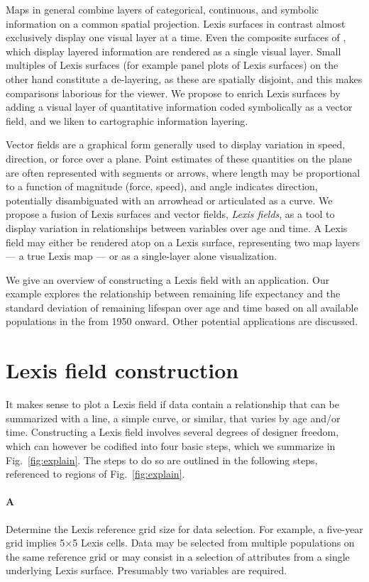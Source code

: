 \documentclass{article}
\begin{document}
Maps in general combine layers of categorical, continuous, and
symbolic information on a common spatial projection. Lexis surfaces in contrast almost exclusively display one visual layer at a time. Even the composite surfaces of \citet{scholey2017visualizing}, which display layered information are rendered as a single visual layer. Small multiples of Lexis surfaces (for example panel plots of Lexis surfaces) on the other hand constitute a de-layering, as these are spatially disjoint, and this makes comparisons laborious for the viewer. We propose to enrich Lexis surfaces by adding a visual layer of quantitative information coded symbolically as a vector field, and we liken to cartographic information layering.

Vector fields are a graphical form generally used to display variation in speed,
direction, or force over a plane. Point estimates of these quantities on the plane are
often represented with segments or arrows, where length may be proportional to a function of
magnitude (force, speed), and angle indicates direction, potentially disambiguated with an arrowhead or articulated as a curve. We propose a fusion of Lexis surfaces and vector fields, \emph{Lexis fields}, as a tool to
display variation in relationships between variables over age and time. A Lexis field may either be rendered atop on a Lexis surface, representing two map layers --- a true Lexis map --- or as a single-layer alone visualization. 

We give an overview of constructing a Lexis field with an application. Our example explores the relationship between remaining life expectancy and
the standard deviation of remaining lifespan over age and time based on all
available populations in the \citet{HMD} from 1950 onward. Other potential applications are discussed.

\section{Lexis field construction}

It makes sense to plot a Lexis field if data contain a relationship that can be summarized with a line, a simple curve, or similar, that varies by age and/or time. Constructing a Lexis field involves several degrees of designer freedom, which can however be codified into four basic steps, which we summarize in Fig.~\ref{fig:explain}. The steps to do so are outlined in the following steps, referenced to regions of Fig.~\ref{fig:explain}.

\paragraph{\textbf{A}} Determine the Lexis reference grid size for data selection. For example, a five-year grid implies 5$\times$5 Lexis cells. Data may be selected from multiple populations on the same reference grid or may consist in a selection of attributes from a single underlying Lexis surface. Presumably two variables are required.
\end{document}

